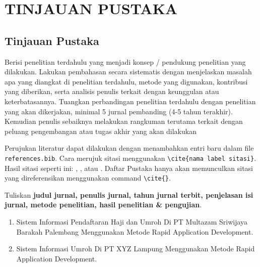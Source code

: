 \newpage
\chapter{TINJAUAN PUSTAKA} \label{Bab II}

\section{Tinjauan Pustaka} \label{II.Tinjauan}
Berisi penelitian terdahulu yang menjadi konsep / pendukung penelitian yang dilakukan. Lakukan pembahasan secara sistematis dengan menjelaskan masalah apa yang diangkat di penelitian terdahulu, metode yang digunakan, kontribusi yang diberikan, serta analisis penulis terkait dengan keunggulan atau keterbatasannya. Tuangkan perbandingan penelitian terdahulu dengan penelitian yang akan dikerjakan, minimal 5 jurnal pembanding (4-5 tahun terakhir). Kemudian penulis sebaiknya melakukan rangkuman terutama terkait dengan peluang pengembangan atau tugas akhir yang akan dilakukan \par

Perujukan literatur dapat dilakukan dengan menambahkan entri baru dalam file \verb|references.bib|. Cara merujuk sitasi menggunakan \verb|\cite{nama label sitasi}|. Hasil sitasi seperti ini: \cite{knuth2001art}, \cite{Vogels2006Am}, atau \cite{Suryanto2019MAE}\cite{Ivanny2014Banding}. Daftar Pustaka hanya akan memunculkan sitasi yang direferensikan menggunakan command \verb|\cite{}|. \par

Tuliskan \textbf{judul jurnal, penulis jurnal, tahun jurnal terbit, penjelasan isi jurnal, metode penelitian, hasil penelitian \& pengujian}. \par
\begin{enumerate}[noitemsep]
	\item Sistem Informasi Pendaftaran Haji dan Umroh Di PT Multazam Sriwijaya Barakah Palembang Menggunakan Metode Rapid Application Development. \blindtext
	\item Sistem Informasi Umroh Di PT XYZ Lampung Menggunakan Metode Rapid Application Development. \blindtext
\end{enumerate}

